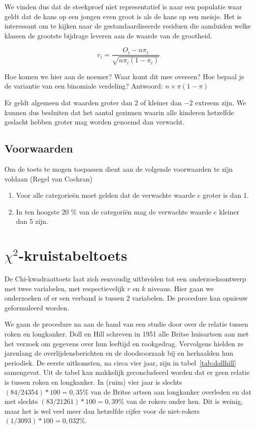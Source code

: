 We vinden dus dat de steekproef niet representatief is naar een populatie waar geldt dat de kans op een jongen even groot is als de kans op een meisje. Het is interessant om te kijken naar de gestandaardiseerde residuen die aanduiden welke klassen de grootste bijdrage leveren aan de waarde van de grootheid. 

\[ r_{i} = \frac{O_{i} - n \pi_{i}}{\sqrt{n \pi_{i}(1-\pi_{i})}} \]

\begin{exercise}
	Hoe komen we hier aan de noemer? Waar komt dit mee overeen? Hoe bepaal je de variantie van een binomiale verdeling?
Antwoord: $n \times \pi (1-\pi)$
\end{exercise}



Er geldt algemeen dat waarden groter dan 2 of kleiner dan $-2$ extreem zijn. We kunnen dus besluiten dat het aantal gezinnen waarin alle kinderen hetzelfde geslacht hebben groter mag worden genoemd dan verwacht.

\subsection{Voorwaarden}
 Om de toets te mogen toepassen dient aan de volgende voorwaarden te zijn voldaan (Regel van Cochran)
\begin{enumerate}
	\item Voor alle categorie\"en moet gelden dat de verwachte waarde $e$ groter is dan 1.
	\item In ten hoogste 20 \% van de categori\"en mag de verwachte waarde $e$ kleiner dan 5 zijn.
\end{enumerate}


\section{\texorpdfstring{$\chi^{2}$}{Chi-kwadraat}-kruistabeltoets}
De Chi-kwadraattoets  laat zich eenvoudig uitbreiden tot een onderzoeksontwerp
met twee variabelen, met respectievelijk $r$ en $k$ niveaus. Hier gaan we onderzoeken of er een verband is tussen 2 variabelen. De procedure kan opnieuw geformuleerd worden.

We gaan de procedure na aan de hand van een studie door \textcite{Doll1954} over de relatie tussen roken en longkanker. Doll en Hill schreven in 1951 alle Britse huisartsen aan met het verzoek om gegevens over hun leeftijd en rookgedrag. Vervolgens hielden ze jarenlang de overlijdensberichten en de doodsoorzaak bij en herhaalden hun periodiek. De eerste uitkomsten, na circa vier jaar, zijn in tabel~\ref{tab:dollhill} samengevat. Uit de tabel kan makkelijk geconcludeerd worden dat er geen relatie is tussen roken en longkanker. In (ruim) vier jaar is slechts $(84 / 24354) * 100 = 0,35\% $ van de Britse artsen aan longkanker overleden en dat met slechts $(83 / 21261) * 100 = 0,39\%$ van de rokers onder hen. Dit is weinig, maar het is wel veel meer dan hetzelfde cijfer voor de niet-rokers $(1 / 3093) * 100 = 0,032\%$.


